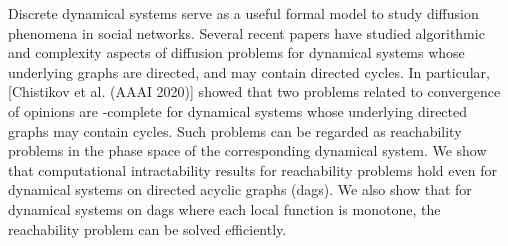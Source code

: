 Discrete dynamical systems serve as a
useful formal model to study diffusion phenomena in social networks.
Several recent papers have studied algorithmic and complexity aspects of
diffusion problems for dynamical systems whose underlying graphs
are directed, and may contain directed cycles.  In particular,
[Chistikov et al. (AAAI 2020)] showed that two problems related to
convergence of opinions are \cpsp-complete
for dynamical systems whose underlying directed graphs
may contain cycles. Such problems can be regarded as
reachability problems in the phase space of the corresponding
dynamical system. We show that computational intractability
results for reachability problems hold even for dynamical systems
on directed acyclic graphs (dags). 
We also show that for dynamical systems on dags
where each local function is monotone, 
the reachability problem can be solved efficiently. 
